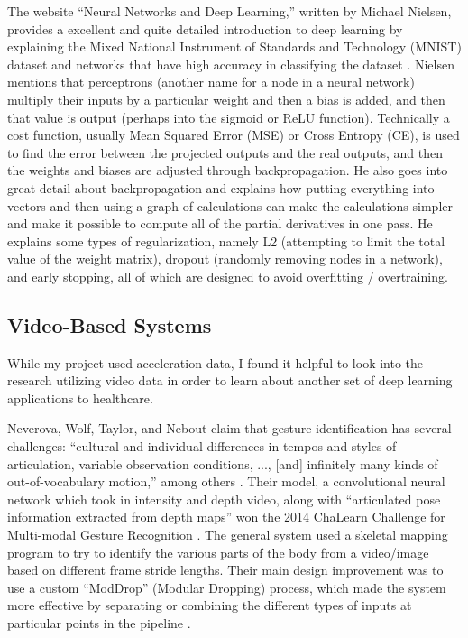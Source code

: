 \documentclass[]{report}
\begin{document}
The website ``Neural Networks and Deep Learning,'' written by Michael Nielsen, provides a excellent and quite detailed introduction to deep learning by explaining the Mixed National Instrument of Standards and Technology (MNIST) dataset and networks that have high accuracy in classifying the dataset \cite{NNDL}. Nielsen mentions that perceptrons (another name for a node in a neural network) multiply their inputs by a particular weight and then a bias is added, and then that value is output (perhaps into the sigmoid or ReLU function). Technically a cost function, usually Mean Squared Error (MSE) or Cross Entropy (CE), is used to find the error between the projected outputs and the real outputs, and then the weights and biases are adjusted through backpropagation. He also goes into great detail about backpropagation and explains how putting everything into vectors and then using a graph of calculations can make the calculations simpler and make it possible to compute all of the partial derivatives in one pass. He explains some types of regularization, namely L2 (attempting to limit the total value of the weight matrix), dropout (randomly removing nodes in a network), and early stopping, all of which are designed to avoid overfitting / overtraining.


\subsection{Video-Based Systems}

While my project used acceleration data, I found it helpful to look into the research utilizing video data in order to learn about another set of deep learning applications to healthcare.

Neverova, Wolf, Taylor, and Nebout claim that gesture identification has several challenges: ``cultural and individual differences in tempos and styles of articulation, variable observation conditions, ..., [and] infinitely many kinds of out-of-vocabulary motion,'' among others \cite{Neverova}. Their model, a convolutional neural network which took in intensity and depth video, along with ``articulated pose information extracted from depth maps'' won the 2014 ChaLearn Challenge for Multi-modal Gesture Recognition \cite{Neverova}. The general system used a skeletal mapping program to try to identify the various parts of the body from a video/image based on different frame stride lengths. Their main design improvement was to use a custom ``ModDrop'' (Modular Dropping) process, which made the system more effective by separating or combining the different types of inputs at particular points in the pipeline \cite{Neverova}. 
\end{document}
